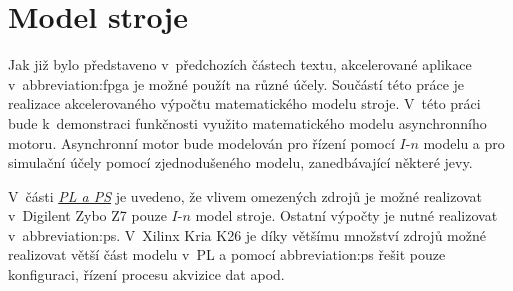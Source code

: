 \documentclass[a4paper, twoside, 11pt]{article}
\begin{document}
\section{Model stroje}\label{sec:model-stroje}
	Jak již bylo představeno v~předchozích částech textu, akcelerované aplikace v~\gls{abbreviation:fpga} je možné použít na různé účely. Součástí této práce je realizace akcelerovaného výpočtu matematického modelu stroje. V~této práci bude k~demonstraci funkčnosti využito matematického modelu asynchronního motoru. Asynchronní motor bude modelován pro řízení pomocí $I$-$n$ modelu a pro simulační účely pomocí zjednodušeného modelu, zanedbávající některé jevy.\par
	V~části \hyperref[subsec:ps-a-pl]{\textit{PL a PS}} je uvedeno, že vlivem omezených zdrojů je možné realizovat v~Digilent Zybo Z7 pouze $I$-$n$ model stroje. Ostatní výpočty je nutné realizovat v~\gls{abbreviation:ps}. V~Xilinx Kria K26 je díky většímu množství zdrojů možné realizovat větší část modelu v~PL a pomocí \gls{abbreviation:ps} řešit pouze konfiguraci, řízení procesu akvizice dat apod.\par
\end{document}
